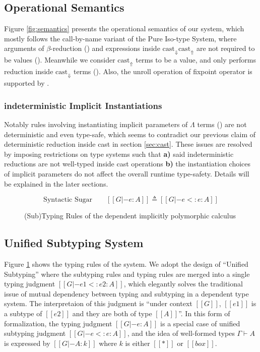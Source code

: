 \documentclass{llncs}
\newcommand{\castup}[0]{\mathrm{cast}_\Uparrow}
\newcommand{\castdn}[0]{\mathrm{cast}_\Downarrow}
\newcommand{\system}[0]{the dependent implicitly polymorphic calculus\xspace}
\begin{document}
\subsection{Operational Semantics}

Figure \ref{fig:semantics} presents the operational semantics of our system,
which mostly follows the call-by-name variant of the Pure Iso-type System\cite{yang2019pure},
where arguments of $\beta$-reduction () and expressions inside $\castdn \castup$
are not required to be values (). Meanwhile we consider $\castup$ terms to be a value,
and only performs reduction inside $\castdn$ terms (). Also, the unroll
operation of fixpoint operator is supported by .

\subsubsection{indeterministic Implicit Instantiations}

Notably rules involving instantiating implicit parameters of $\Lambda$ terms
() are not deterministic and even type-safe, which seems to
contradict our previous claim of deterministic reduction inside cast in section \ref{sec:cast}.
These issues are resolved by imposing restrictions on type systems such that
\textbf{a)} said indeterministic reductions are not well-typed inside cast operations
\textbf{b)} the instantiation choices of implicit parameters do not affect the
overall runtime type-safety.
Details will be explained in the later sections.

\begin{figure}
    \centering

    \begin{equation*}
       \text{Syntactic Sugar} \qquad [[G |- e : A]] \triangleq [[G |- e <: e : A]]
    \end{equation*}
    \caption{(Sub)Typing Rules of \system}
    \label{fig:typing}
\end{figure}

\subsection{Unified Subtyping System}

Figure \ref{fig:typing} shows the typing rules of the system. We adopt the design
of ``Unified Subtyping''\cite{yang2017unifying} where the subtyping rules and
typing rules are merged into a single typing judgment $[[G |- e1 <: e2 : A]]$,
which elegantly solves the traditional issue of mutual dependency between typing
and subtyping in a dependent type system.
The interpretaion of this judgment is ``under context $[[G]]$, $[[e1]]$ is a
subtype of $[[e2]]$ and they are both of type $[[A]]$''.
In this form of formalization, the typing judgment $[[G |- e : A]]$ is a
special case of unified subtyping judgment $[[G |- e <: e : A]]$,
and the idea of well-formed types $\Gamma \vdash A$ is expressed by
$[[G |- A : k]]$ where $k$ is either $[[*]]$ or $[[box]]$.
\end{document}
